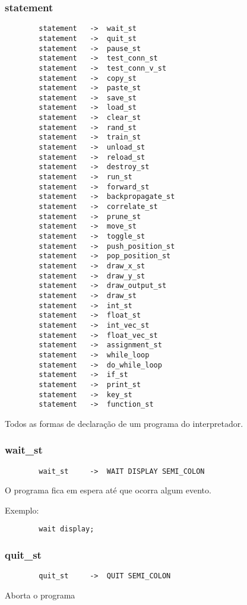 \documentclass[a4paper,10pt]{article}
\begin{document}
	\subsubsection{statement}
		\begin{lstlisting}
		statement	->	wait_st
		statement	->	quit_st
		statement	->	pause_st
		statement	->	test_conn_st
		statement	->	test_conn_v_st
		statement	->	copy_st
		statement	->	paste_st
		statement	->	save_st
		statement	->	load_st
		statement	->	clear_st
		statement	->	rand_st
		statement	->	train_st
		statement	->	unload_st
		statement	->	reload_st
		statement	->	destroy_st
		statement	->	run_st
		statement	->	forward_st
		statement	->	backpropagate_st
		statement	->	correlate_st
		statement	->	prune_st
		statement	->	move_st
		statement	->	toggle_st
		statement	->	push_position_st
		statement	->	pop_position_st
		statement	->	draw_x_st
		statement	->	draw_y_st
		statement	->	draw_output_st
		statement	->	draw_st
		statement	->	int_st
		statement	->	float_st
		statement	->	int_vec_st
		statement	->	float_vec_st
		statement	->	assignment_st
		statement	->	while_loop
		statement	->	do_while_loop
		statement	->	if_st
		statement	->	print_st
		statement	->	key_st
		statement	->	function_st
		\end{lstlisting}
		Todos as formas de declara\c{c}\~ao de um programa do interpretador.
		\vspace{10mm}
		
	\subsubsection{wait\_st}
		\begin{lstlisting}
		wait_st		->	WAIT DISPLAY SEMI_COLON
		\end{lstlisting}
		O programa fica em espera at\'e que ocorra algum evento.
		
		Exemplo:
		\begin{lstlisting}
		wait display;
		\end{lstlisting}
		\vspace{10mm}
	\subsubsection{quit\_st}
		\begin{lstlisting}
		quit_st		->	QUIT SEMI_COLON
		\end{lstlisting}
		Aborta o programa
		
\end{document}
